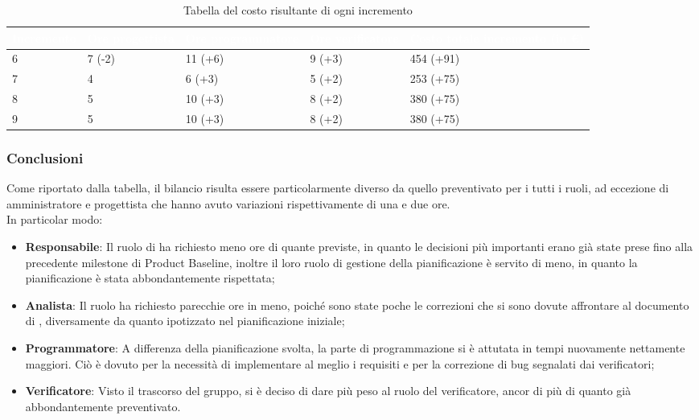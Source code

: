 {
\renewcommand{\arraystretch}{1.65}
\centering
\begin{longtable}{ C{2.1cm} C{2.7cm} C{3cm} C{3cm} C{3.3cm} }
\caption{Tabella del costo risultante di ogni incremento}\\
\textcolor{white}{\textbf{Incremento}} & 
\textcolor{white}{\textbf{Ore progettista}} &
\textcolor{white}{\textbf{Ore programmatore}}&
\textcolor{white}{\textbf{Ore verificatore}}&
\textcolor{white}{\textbf{Costo totale incremento (in \euro{})}}\\
\endhead

6 & 7 (-2) & 11 (+6) & 9 (+3) & 454 (+91) \\
7 & 4      &  6 (+3) & 5 (+2) & 253 (+75) \\
8 & 5      & 10 (+3) & 8 (+2) & 380 (+75) \\
9 & 5      & 10 (+3) & 8 (+2) & 380 (+75) \\

\end{longtable}
}

\subsubsection{Conclusioni}
Come riportato dalla tabella, il bilancio risulta essere particolarmente diverso da quello preventivato per i tutti i ruoli, ad eccezione di amministratore e progettista che hanno avuto variazioni rispettivamente di una e due ore. \\
In particolar modo:
\begin{itemize}
	\item \textbf{Responsabile}: Il ruolo di \Responsabile{} ha richiesto meno ore di quante previste, in quanto le decisioni più importanti erano già state prese fino alla precedente milestone di Product Baseline, inoltre il loro ruolo di gestione della pianificazione è servito di meno, in quanto la pianificazione è stata abbondantemente rispettata;
	\item \textbf{Analista}: Il ruolo ha richiesto parecchie ore in meno, poiché sono state poche le correzioni che si sono dovute affrontare al documento di \AdR{}, diversamente da quanto ipotizzato nel pianificazione iniziale;
	\item \textbf{Programmatore}: A differenza della pianificazione svolta, la parte di programmazione si è attutata in tempi nuovamente nettamente maggiori. Ciò è dovuto per la necessità di implementare al meglio i requisiti e per la correzione di bug segnalati dai verificatori;
	\item \textbf{Verificatore}: Visto il trascorso del gruppo, si è deciso di dare più peso al ruolo del verificatore, ancor di più di quanto già abbondantemente preventivato.
\end{itemize}

